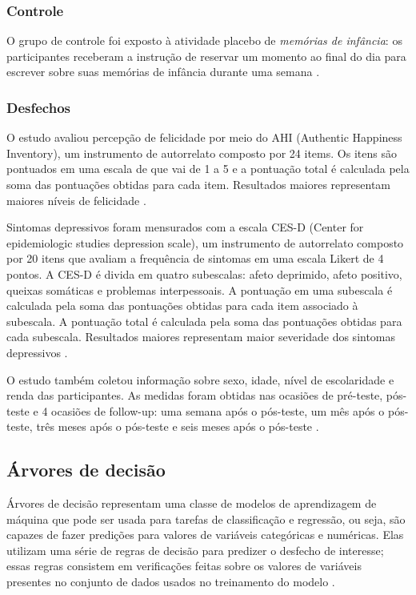\subsubsection{Controle}

O grupo de controle foi exposto à atividade placebo de \emph{memórias de infância}: os participantes receberam a instrução de reservar um momento ao
final do dia para escrever sobre suas memórias de infância durante uma semana \cite{Woodworth2017}.

\subsubsection{Desfechos}

O estudo avaliou percepção de felicidade por meio do AHI (Authentic Happiness Inventory), um instrumento de autorrelato composto por 24 items. Os itens
são pontuados em uma escala de que vai de 1 a 5 e a pontuação total é calculada pela soma das pontuações obtidas para cada item. Resultados maiores representam
maiores níveis de felicidade \cite{Park2010}.

Sintomas depressivos foram mensurados com a escala CES-D (Center for epidemiologic studies depression scale), um instrumento de autorrelato composto por 20
itens que avaliam a frequência de sintomas em uma escala Likert de 4 pontos. A CES-D é divida em quatro subescalas: afeto deprimido, afeto positivo, queixas
somáticas e problemas interpessoais. A pontuação em uma subescala é calculada pela soma das pontuações obtidas para cada item associado à subescala. A pontuação
total é calculada pela soma das pontuações obtidas para cada subescala. Resultados maiores representam maior severidade dos sintomas depressivos \cite{Radloff1977}.

O estudo também coletou informação sobre sexo, idade, nível de escolaridade e renda das participantes. As medidas foram obtidas nas ocasiões de pré-teste, pós-teste
e 4 ocasiões de follow-up: uma semana após o pós-teste, um mês após o pós-teste, três meses após o pós-teste e seis meses após o pós-teste \cite{Woodworth2017}.

\subsection{Árvores de decisão}

Árvores de decisão representam uma classe de modelos de aprendizagem de máquina que pode ser usada para tarefas de classificação e regressão, ou seja, são
capazes de fazer predições para valores de variáveis categóricas e numéricas. Elas utilizam uma série de regras de decisão para predizer o desfecho de interesse;
essas regras consistem em verificações feitas sobre os valores de variáveis presentes no conjunto de dados usados no treinamento do modelo \cite{Theobald2021, Bi2019}.

